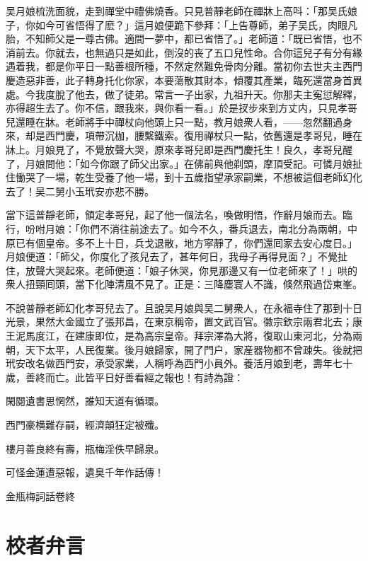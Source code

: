 吴月娘梳洗面貌，走到禪堂中禮佛燒香。只見普靜老師在禪牀上高呌：「那吴氏娘子，你如今可省悟得了麽？」這月娘便跪下參拜：「上告尊師，弟子吴氏，肉眼凡胎，不知師父是一尊古佛。適間一夢中，都已省悟了。」老師道：「既已省悟，也不消前去。你就去，也無過只是如此，倒沒的丧了五口兒性命。合你這兒子有分有緣遇着我，都是你平日一點善根所種，不然定然難免骨肉分離。當初你去世夫主西門慶造惡非善，此子轉身托化你家，本要蕩散其財本，傾覆其產業，臨死還當身首異處。今我度脫了他去，做了徒弟。常言一子出家，九祖升天。你那夫主寃愆解釋，亦得超生去了。你不信，跟我來，與你看一看。」於是扠步來到方丈内，只見孝哥兒還睡在牀。老師將手中禪杖向他頭上只一點，教月娘衆人看，——忽然翻過身來，却是西門慶，項帶沉枷，腰繫鐵索。復用禪杖只一點，依舊還是孝哥兒，睡在牀上。月娘見了，不覺放聲大哭，原來孝哥兒即是西門慶托生！良久，孝哥兒醒了，月娘問他：「如今你跟了師父出家。」在佛前與他剃頭，摩頂受記。可憐月娘扯住慟哭了一場，乾生受養了他一場，到十五歲指望承家嗣業，不想被這個老師幻化去了！吴二舅小玉玳安亦悲不勝。

當下這普靜老師，領定孝哥兒，起了他一個法名，喚做明悟，作辭月娘而去。臨行，吩咐月娘：「你們不消往前途去了。如今不久，番兵退去，南北分為兩朝，中原已有個皇帝。多不上十日，兵戈退散，地方寜靜了，你們還囘家去安心度日。」月娘便道：「師父，你度化了孩兒去了，甚年何日，我母子再得見面？」不覺扯住，放聲大哭起來。老師便道：「娘子休哭，你見那邊又有一位老師來了！」哄的衆人扭頸囘頭，當下化陣清風不見了。正是：三降塵寰人不識，倏然飛過岱東峯。

不說普靜老師幻化孝哥兒去了。且說吴月娘與吴二舅衆人，在永福寺住了那到十日光景，果然大金國立了張邦昌，在東京稱帝，置文武百官。徽宗欽宗兩君北去；康王泥馬度江，在建康即位，是為高宗皇帝。拜宗澤為大將，復取山東河北，分為兩朝，天下太平，人民復業。後月娘歸家，開了門户，家産器物都不曾疎失。後就把玳安改名做西門安，承受家業，人稱呼為西門小員外。養活月娘到老，壽年七十歲，善終而亡。此皆平日好善看經之報也！有詩為證：
\begin{myquote}
閑閱遺書思惘然，誰知天道有循環。

西門豪横難存嗣，經濟顛狂定被殲。

樓月善良終有壽，瓶梅淫佚早歸泉。

可怪金蓮遭惡報，遺臭千年作話傳！
\end{myquote}

金瓶梅詞話卷終


\chapter*{校者弁言}

